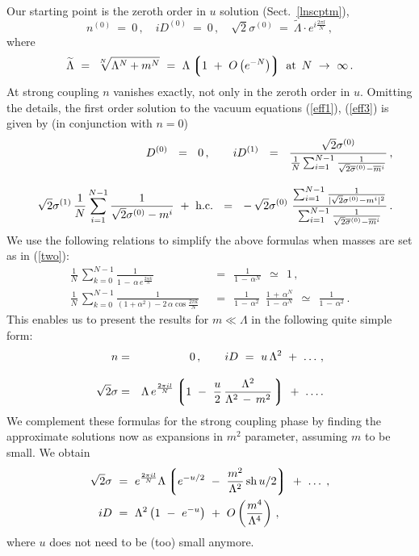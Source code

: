 \documentclass[epsfig,12pt]{article}
\def\beq{\begin{equation}}
\def\eeq{\end{equation}}
\def\beqn{\begin{eqnarray}}
\def\eeqn{\end{eqnarray}}
\def\beqn{\begin{eqnarray}}
\def\eeqn{\end{eqnarray}}
\def\beq{\begin{equation}}
\def\eeq{\end{equation}}
\newcommand{\wt}{\widetilde}
\newcommand{\ov}{\overline}
\newcommand{\lgr}{\left\lgroup}
\newcommand{\rgr}{\right\rgroup}
\newcommand{\nz}{{n^{(0)}}}
\newcommand{\Dz}{{D^{(0)}}}
\newcommand{\Do}{{D^{(1)}}}
\newcommand{\sigz}{{\sigma^{(0)}}}
\newcommand{\sigo}{{\sigma^{(1)}}}
\newcommand{\bsigz}{{\ov{\sigma}{}^{(0)}}}
\begin{document}
{Our starting point is the zeroth order in $ u $ solution (Sect.~\ref{lnscptm}),
\beq
	\nz ~=~ 0\,, \quad
	i \Dz ~=~ 0\,, \quad
	\sqrt{2}\sigz ~=~ \wt{\Lambda}\cdot e^{i\frac{2\pi l}{N}}\,,  
	\label{zosol}
	\eeq
	where
\beq
	\wt{\Lambda} ~=~ \sqrt[N]{ \Lambda^N + m^N } ~=~ \Lambda\lgr 1 ~+~ O\left(e^{-N}\right) \rgr\,\, 
	{\rm at}\,\,\, N ~\to~ \infty\,.
	\label{tilla}
\eeq
	At strong coupling $n$ vanishes exactly, not only in the zeroth order in $u$.
Omitting the details, the first order solution to the vacuum equations (\ref{eff1}), (\ref{eff3}) 
is given by (in conjunction with $n=0$)
\beqn
&&
 \Dz  ~~=~~ 0\,,\qquad
	i \Do ~~=~~ \frac{ \sqrt{2}\sigz } 
		    {\frac{1}{N} \sum_{i=1}^{N-1} 
		                 \frac{1}{ \sqrt{2}\bsigz - \ov{m}{}^i } } \,,
\label{strongeq}\\[3mm]
&&
	\sqrt{2}\sigo \, \frac{1}{N} \sum_{i=1}^{N-1} \frac{1}
			{ \sqrt{2}\sigz - m^i }
		~+~ \text{h.c.} ~~=~~
	-\, \sqrt{2}\sigz  \,\,
	\frac{ \sum_{i=1}^{N-1} 
			\frac{1}{ | \sqrt{2}\sigz - m^i |^2 } }
	  {  \sum_{i=1}^{N-1} \frac{1}{ \sqrt{2}\bsigz - \ov{m}{}^i } }\,.
\notag
\eeqn
We use the following relations to simplify the above formulas when masses are set as in (\ref{two}):
\begin{align}
	\frac{1}{N}\, \sum_{k=0}^{N-1} \frac{1} { 1 \,-\, \alpha\,e^{\frac{2\pi i k}{N}} } &~~=~~
		\frac{1}{1 \,-\, \alpha^N} ~~\simeq~~ 1\,,
	\nonumber\\[2mm]
	\frac{1}{N}\, \sum_{k=0}^{N-1} \frac{1} { (1 + \alpha^2) - 2\,\alpha \cos \frac{2 \pi k}{N} }
		&~~=~~
	\frac{1} {1 \,-\, \alpha^2} \,\,\, \frac{1 \,+\, \alpha^N}{ 1 \,-\, \alpha^N} 
		~~\simeq~~
	\frac{1} {1 \,-\, \alpha^2} \,.
	\label{vspfor}
\end{align}
	This enables us to present the results for $m\ll\Lambda$ in the following quite simple form:
\beqn
\label{finstr}
	n 
	&=&  0 \,,\qquad i D   ~=~  u\, \Lambda^2 ~+~ \ldots \,, 
	\nonumber\\[3mm]
	\sqrt{2}\sigma & =& \Lambda \, e^{\frac{2\pi i l}{N}} \lgr
			1 ~-~ \frac{u}{2}\, 
				\frac{\Lambda^2}{\Lambda^2 \,-\, m^2}\,\rgr ~+~ \ldots.
\eeqn
	We complement these formulas for the strong coupling phase by finding the approximate solutions
	now as expansions in $m^2$ parameter, assuming $m$ to be small.
	We obtain
\begin{align}
%
\notag
	\sqrt{2}\sigma & ~=~ e^{\frac{2\pi i l}{N}} \Lambda \lgr 
			   e^{-u/2} ~-~ \frac{m^2}{\Lambda^2}\, {\rm sh}\,u/2 \rgr ~+~ \ldots\;,
	\\
\label{smstr}
	iD & ~=~ \Lambda^2 \left( 1 ~-~ e^{-u} \right) ~+~ O\left(\frac{m^4}{\Lambda^4}\right)\, ,
%
\end{align}
	where $u$ does not need to be (too) small anymore.

}
\end{document}
